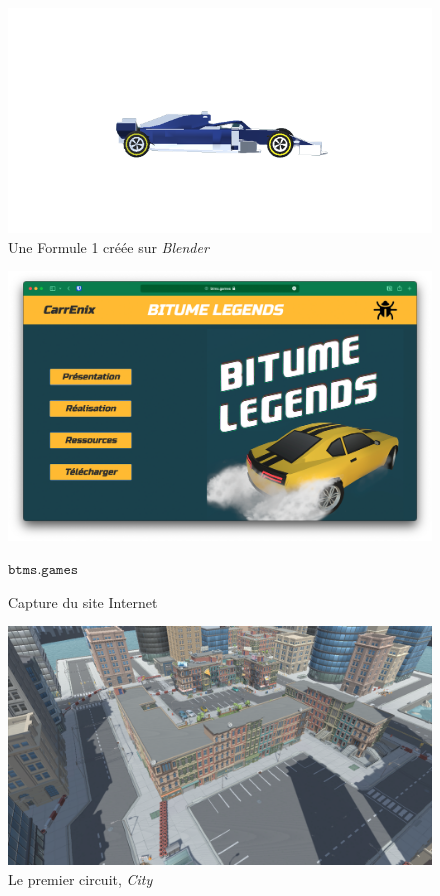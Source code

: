 \documentclass[12pt,a4paper]{article}
\newcommand{\SITE}{\(\mathtt{btms.games}\)}
\begin{document}
        \begin{figure}[h]
            \includegraphics[width=15cm]{f21BG.png}
            \caption{Une Formule 1 créée sur \textsl{Blender}}
            \label{fig:F1}
            \centering
        \end{figure}

        \begin{figure}[t]
            \centering
            \includegraphics[width=15cm]{site.png}
            \caption{Capture du site Internet}
            \label{fig:site}
            \SITE
        \end{figure}

        \begin{figure}[t]
            \centering
            \includegraphics[width=15cm]{trackcity.png}
            \caption{Le premier circuit, \textsl{City}}
            \label{fig:track1}
        \end{figure}
\end{document}
